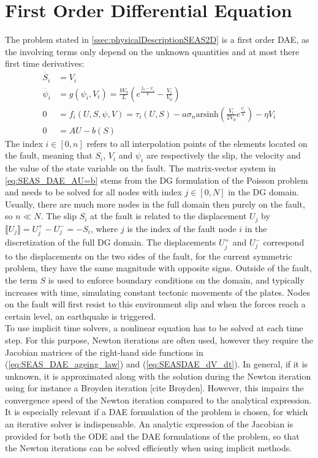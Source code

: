 \section{First Order Differential Equation}
The problem stated in \autoref{ssec:physicalDescriptionSEAS2D} is a first order DAE, as the involving terms only depend on the unknown quantities and at most there first time derivatives:
\begin{align}
    \dot{S_i} &= V_i \label{eq:SEASDAE_dV_dt} \\
	\dot{\psi_i} &= g(\psi_i, V_i) =\frac{bV_0}{L}\left(e^{\frac{f_0-\psi_i}{b}} - \frac{V_i}{V_0}\right) \label{eq:SEAS_DAE_ageing_law} \\
	0 &= f_i(U,S,\psi,V) = \tau_i(U,S) - a\sigma_n\text{arsinh}\left(\frac{V_i}{2V_0}e^{\frac{\psi_i}{a}}\right) -\eta V_i \label{eq:SEASDAE_frictionLaw}\\
    0 &= AU - b(S) \label{eq:SEAS_DAE_AU=b}  
\end{align}
The index $i\in[0,n]$ refers to all interpolation points of the elements located on the fault, meaning that $S_i$, $V_i$ and $\psi_i$ are respectively the slip, the velocity and the value of the state variable on the fault. The matrix-vector system in \autoref{eq:SEAS_DAE_AU=b} stems from the DG formulation of the Poisson problem and needs to be solved for all nodes with index $j\in[0,N]$ in the DG domain. Usually, there are much more nodes in the full domain then purely on the fault, so $n \ll N$. The slip $S_i$ at the fault is related to the displacement $U_j$ by $\llbracket U_j \rrbracket = U_j^+ - U_j^- = -S_i$, where $j$ is the index of the fault node $i$ in the discretization of the full DG domain. The displacements $U_j^+$ and $U_j^-$ correspond to the displacements on the two sides of the fault, for the current symmetric problem, they have the same magnitude with opposite signs. Outside of the fault, the term $S$ is used to enforce boundary conditions on the domain, and typically increases with time, simulating constant tectonic movements of the plates. Nodes on the fault will first resist to this environment slip and when the forces reach a certain level, an earthquake is triggered. \\
To use implicit time solvers, a nonlinear equation has to be solved at each time step. For this purpose, Newton iterations are often used, however they require the Jacobian matrices of the right-hand side functions in (\ref{eq:SEAS_DAE_ageing_law}) and (\ref{eq:SEASDAE_dV_dt}). In general, if it is unknown, it is approximated along with the solution during the Newton iteration using for instance a Broyden iteration [cite Broyden]. However, this impairs the convergence speed of the Newton iteration compared to the analytical expression. It is especially relevant if a DAE formulation of the problem is chosen, for which an iterative solver is indispensable. An analytic expression of the Jacobian is provided for both the ODE and the DAE formulations of the problem, so that the Newton iterations can be solved efficiently when using implicit methods.
 

